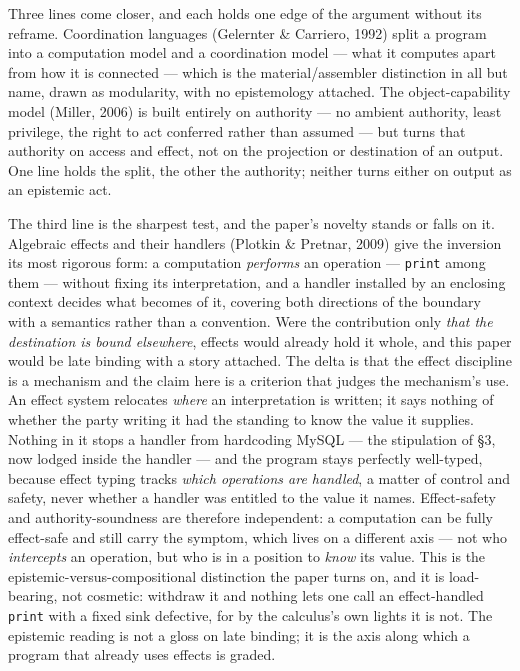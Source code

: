 \documentclass[
]{article}
\begin{document}
Three lines come closer, and each holds one edge of the argument without
its reframe. Coordination languages (Gelernter \& Carriero, 1992) split
a program into a computation model and a coordination model --- what it
computes apart from how it is connected --- which is the
material/assembler distinction in all but name, drawn as modularity,
with no epistemology attached. The object-capability model (Miller,
2006) is built entirely on authority --- no ambient authority, least
privilege, the right to act conferred rather than assumed --- but turns
that authority on access and effect, not on the projection or
destination of an output. One line holds the split, the other the
authority; neither turns either on output as an epistemic act.

The third line is the sharpest test, and the paper's novelty stands or
falls on it. Algebraic effects and their handlers (Plotkin \& Pretnar,
2009) give the inversion its most rigorous form: a computation
\emph{performs} an operation --- \texttt{print} among them --- without
fixing its interpretation, and a handler installed by an enclosing
context decides what becomes of it, covering both directions of the
boundary with a semantics rather than a convention. Were the
contribution only \emph{that the destination is bound elsewhere},
effects would already hold it whole, and this paper would be late
binding with a story attached. The delta is that the effect discipline
is a mechanism and the claim here is a criterion that judges the
mechanism's use. An effect system relocates \emph{where} an
interpretation is written; it says nothing of whether the party writing
it had the standing to know the value it supplies. Nothing in it stops a
handler from hardcoding MySQL --- the stipulation of §3, now lodged
inside the handler --- and the program stays perfectly well-typed,
because effect typing tracks \emph{which operations are handled}, a
matter of control and safety, never whether a handler was entitled to
the value it names. Effect-safety and authority-soundness are therefore
independent: a computation can be fully effect-safe and still carry the
symptom, which lives on a different axis --- not who \emph{intercepts}
an operation, but who is in a position to \emph{know} its value. This is
the epistemic-versus-compositional distinction the paper turns on, and
it is load-bearing, not cosmetic: withdraw it and nothing lets one call
an effect-handled \texttt{print} with a fixed sink defective, for by the
calculus's own lights it is not. The epistemic reading is not a gloss on
late binding; it is the axis along which a program that already uses
effects is graded.
\end{document}
